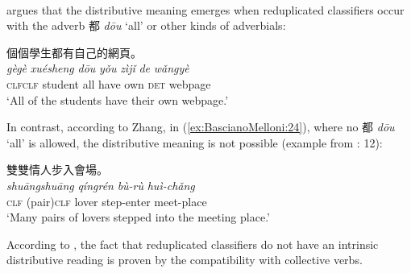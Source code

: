 \documentclass[output=paper]{langsci/langscibook}
\begin{document}
	\\
	\z
\z

%
\citet[12]{Zhang2014} %
%
argues that the distributive meaning emerges when
reduplicated classifiers occur with the adverb 都 \emph{dōu} `all' %
\citep[even when it is allowed but does not show up; see e.g.][]{Guo99} %
%
or other
kinds of adverbials:

\ea\label{ex:BascianoMelloni:23}個個學生都有自己的網頁。\\
\gll \emph{gè\tld{}gè} \emph{xuésheng} \emph{dōu} \emph{yǒu} \emph{zìjǐ} \emph{de} \emph{wǎngyè}\\
\textsc{clf}\emph{\tld{}}\textsc{clf} student all have own \textsc{det} webpage\\
\glt `All of the students have their own webpage.'\\
\z

In contrast, according to Zhang, in (\ref{ex:BascianoMelloni:24}), where no 都 \emph{dōu} `all'
is allowed, the distributive meaning is not possible (example from %
\citealt{Zhang2014}%
%
: 12):

\ea\label{ex:BascianoMelloni:24}雙雙情人步入會場。\\
\gll \emph{shuāng\tld{}shuāng} \emph{qíngrén} \emph{bù-rù} \emph{huì-chǎng} \\
 {\textsc{clf} (pair)\emph{\tld{}}\textsc{clf}} lover step-enter meet-place\\
\glt `Many pairs of lovers stepped into the meeting place.'
\z


According to %
\citet[12]{Zhang2014}%
%
, the fact that reduplicated classifiers do
not have an intrinsic distributive reading is proven by the
compatibility with collective verbs.
\end{document}
